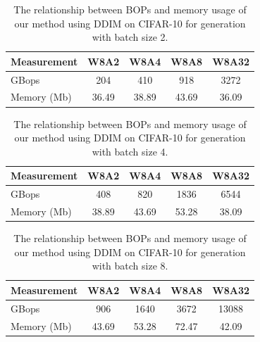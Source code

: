 \begin{table}[ht!]
\small
\centering
\caption{The relationship between BOPs and memory usage of our method using DDIM on CIFAR-10 for generation with batch size 2.}
\begin{tabular}{l|ccc|c}
\toprule
{Measurement} & {W8A2} & {W8A4} & {W8A8} & {W8A32} \\
\midrule
GBops & 204 & 410 & 918 & 3272 \\
Memory (Mb) & 36.49 & 38.89 & 43.69 & 36.09 \\
\bottomrule
\end{tabular}
\label{apptab:memory_2}
\end{table}

\begin{table}[ht!]
\small
\centering
\caption{The relationship between BOPs and memory usage of our method using DDIM on CIFAR-10 for generation with batch size 4.}
\begin{tabular}{l|ccc|c}
\toprule
{Measurement} & {W8A2} & {W8A4} & {W8A8} & {W8A32} \\
\midrule
GBops & 408 & 820 & 1836 & 6544 \\
Memory (Mb) & 38.89 & 43.69 & 53.28 & 38.09 \\
\bottomrule
\end{tabular}
\label{apptab:memory_4}
\end{table}

\begin{table}[ht!]
\small
\centering
\caption{The relationship between BOPs and memory usage of our method using DDIM on CIFAR-10 for generation with batch size 8.}
\begin{tabular}{l|ccc|c}
\toprule
{Measurement} & {W8A2} & {W8A4} & {W8A8} & {W8A32} \\
\midrule
GBops & 906 & 1640 & 3672 & 13088 \\
Memory (Mb) & 43.69 & 53.28 & 72.47 & 42.09 \\
\bottomrule
\end{tabular}
\label{apptab:memory_8}
\end{table}